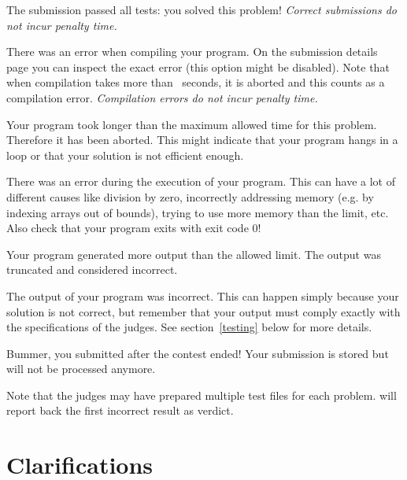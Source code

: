 \begin{description}[\setleftmargin{4.5cm}]
\item[CORRECT]
The submission passed all tests: you solved this problem!
\textit{Correct submissions do not incur penalty time.}

\item[COMPILER-ERROR]
There was an error when compiling your program. On the submission
details page you can inspect the exact error (this option might be
disabled).
Note that when compilation takes more than \COMPILETIME\ seconds, it is aborted and
this counts as a compilation error.
\textit{Compilation errors do not incur penalty time.}

\item[TIMELIMIT]
Your program took longer than the maximum allowed time for this
problem. Therefore it has been aborted. This might indicate that your
program hangs in a loop or that your solution is not efficient
enough.

\item[RUN-ERROR]
There was an error during the execution of your program. This can have
a lot of different causes like division by zero, incorrectly
addressing memory (e.g. by indexing arrays out of bounds), trying to
use more memory than the limit, etc.
Also check that your program exits with exit code 0!

\item[OUTPUT-LIMIT]
Your program generated more output than the allowed limit. The output
was truncated and considered incorrect.

\item[WRONG-ANSWER]
The output of your program was incorrect. This can happen simply
because your solution is not correct, but remember that your output
must comply exactly with the specifications of the judges. See
section~\ref{testing} below for more details.

\item[TOO-LATE]
Bummer, you submitted after the contest ended! Your submission is
stored but will not be processed anymore.
\end{description}

Note that the judges may have prepared multiple test files for each
problem. \DOMjudge will report back the first incorrect result as verdict.

\section{Clarifications}

